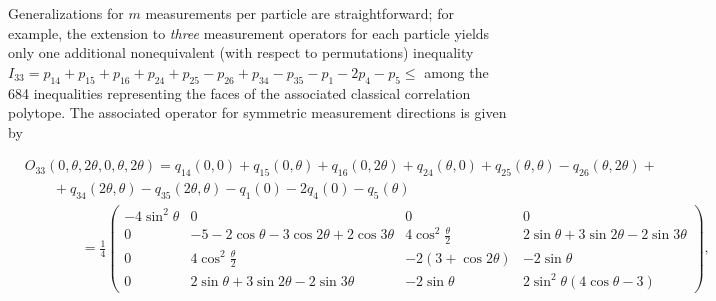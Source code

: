 \documentclass[prl,showpacs,showkeys,amsfonts,amsmath,twocolumn]{revtex4}
\begin{document}
Generalizations for $m$ measurements per particle are
straightforward;
for example, the extension to \emph{three} measurement operators for each particle
yields only one additional nonequivalent (with respect to permutations)
inequality \cite{2000-poly,collins-gisin-2003,sliwa-2003}
$I_{33}=p_{14} + p_{15} + p_{16} + p_{24} + p_{25} - p_{26} + p_{34} - p_{35}
- p_{1} - 2 p_{4} - p_{5} \leq$ among the 684 inequalities representing the
 faces of the associated classical correlation polytope.
The associated operator for symmetric
measurement directions is given by
\begin{widetext}
\begin{equation}
\begin{array}{lll}
&O_{33}(0,\theta,2\theta,0,\theta,2\theta)= q_{14}(0,0) + q_{15}(0,\theta) + q_{16}(0,2\theta) + q_{24}(\theta,0) +
q_{25}(\theta,\theta) - q_{26}(\theta,2\theta) +\\
&\qquad  + q_{34}(2\theta,\theta)- q_{35}(2\theta,\theta)-q_{1}(0) - 2 q_{4}(0) - q_{5}(\theta) \\
&\qquad \qquad =\frac{1}{4}\left(
\begin{smallmatrix}
-4\sin^2\theta & 0 & 0 & 0\\
0 & -5-2\cos\theta - 3\cos 2\theta + 2\cos 3\theta &
4\cos^2\frac{\theta}{2} & 2\sin\theta + 3 \sin 2\theta - 2 \sin
3\theta\\
0 & 4\cos^2\frac{\theta}{2} & -2(3+\cos 2\theta) & - 2\sin\theta \\
0 &  2\sin\theta + 3 \sin 2\theta - 2 \sin 3\theta & - 2\sin\theta &
2\sin^2\theta(4\cos\theta -3)
\end{smallmatrix}\right),
\end{array}
\label{2004-qbounds-e5}
\end{equation}
\end{widetext}
\end{document}
